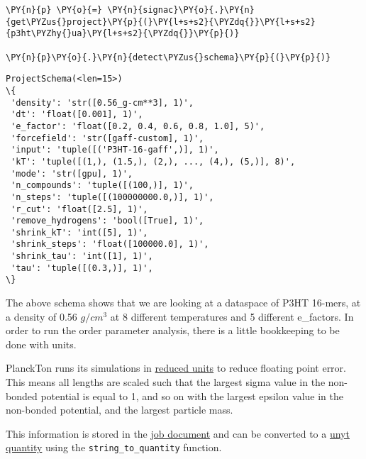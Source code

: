     \begin{tcolorbox}[breakable, size=fbox, boxrule=1pt, pad at break*=1mm,colback=cellbackground, colframe=cellborder]
\begin{Verbatim}[commandchars=\\\{\}]
\PY{n}{p} \PY{o}{=} \PY{n}{signac}\PY{o}{.}\PY{n}{get\PYZus{}project}\PY{p}{(}\PY{l+s+s2}{\PYZdq{}}\PY{l+s+s2}{p3ht\PYZhy{}ua}\PY{l+s+s2}{\PYZdq{}}\PY{p}{)}

\PY{n}{p}\PY{o}{.}\PY{n}{detect\PYZus{}schema}\PY{p}{(}\PY{p}{)}
\end{Verbatim}
\end{tcolorbox}

            \begin{tcolorbox}[breakable, size=fbox, boxrule=.5pt, pad at break*=1mm, opacityfill=0]
\begin{Verbatim}[commandchars=\\\{\}]
ProjectSchema(<len=15>)
\{
 'density': 'str([0.56_g-cm**3], 1)',
 'dt': 'float([0.001], 1)',
 'e_factor': 'float([0.2, 0.4, 0.6, 0.8, 1.0], 5)',
 'forcefield': 'str([gaff-custom], 1)',
 'input': 'tuple([('P3HT-16-gaff',)], 1)',
 'kT': 'tuple([(1,), (1.5,), (2,), ..., (4,), (5,)], 8)',
 'mode': 'str([gpu], 1)',
 'n_compounds': 'tuple([(100,)], 1)',
 'n_steps': 'tuple([(100000000.0,)], 1)',
 'r_cut': 'float([2.5], 1)',
 'remove_hydrogens': 'bool([True], 1)',
 'shrink_kT': 'int([5], 1)',
 'shrink_steps': 'float([100000.0], 1)',
 'shrink_tau': 'int([1], 1)',
 'tau': 'tuple([(0.3,)], 1)',
\}
\end{Verbatim}
\end{tcolorbox}
        
    The above schema shows that we are looking at a dataspace of P3HT
16-mers, at a density of 0.56 \(g/cm^{3}\) at 8 different temperatures
and 5 different e\_factors. In order to run the order parameter
analysis, there is a little bookkeeping to be done with units.

PlanckTon runs its simulations in
\href{https://hoomd-blue.readthedocs.io/en/latest/units.html}{reduced
units} to reduce floating point error. This means all lengths are scaled
such that the largest sigma value in the non-bonded potential is equal
to 1, and so on with the largest epsilon value in the non-bonded
potential, and the largest particle mass.

This information is stored in the
\href{https://docs.signac.io/en/latest/jobs.html\#the-job-document}{job
document} and can be converted to a
\href{https://unyt.readthedocs.io/en/stable/}{unyt quantity} using the
\texttt{string\_to\_quantity} function.

